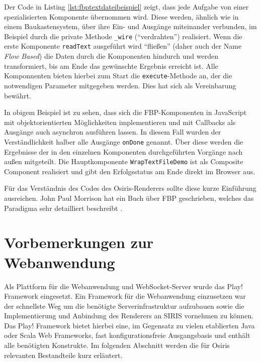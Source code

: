 Der Code in Listing \ref{lst:fbptextdateibeispiel} zeigt, dass jede Aufgabe von einer spezialisierten Komponente übernommen wird. Diese werden, ähnlich wie in einem Baukastensystem, über ihre Ein- und Ausgänge miteinander verbunden, im Beispiel durch die private Methode \texttt{\_wire} ("`verdrahten"') realisiert. Wenn die erste Komponente \texttt{readText} ausgeführt wird "`fließen"' (daher auch der Name \textit{Flow Based}) die Daten durch die Komponenten hindurch und werden transformiert, bis am Ende das gewünschte Ergebnis erreicht ist. Alle Komponnenten bieten hierbei zum Start die \texttt{execute}-Methode an, der die notwendigen Parameter mitgegeben werden. Dies hat sich als Vereinbarung bewährt.

In obigem Beispiel ist zu sehen, dass sich die FBP-Komponenten in JavaScript mit objektorientierten Möglichkeiten implementieren und mit Callbacks als Ausgänge auch asynchron ausführen lassen. In diesem Fall wurden der Verständlichkeit halber alle Ausgänge \texttt{onDone} genannt. Über diese werden die Ergebnisse der in den einzelnen Komponenten durchgeführten Vorgänge nach außen mitgeteilt. Die Hauptkomponente \texttt{WrapTextFileDemo} ist als Composite Component realisiert und gibt den Erfolgsstatus am Ende direkt im Browser aus.

Für das Verständnis des Codes des Osiris-Renderers sollte diese kurze Einführung ausreichen. John Paul Morrison hat ein Buch über FBP geschrieben, welches das Paradigma sehr detailliert beschreibt \autocite{FlowBasedProgramming}.

\section{Vorbemerkungen zur Webanwendung}
Als Plattform für die Webanwendung und WebSocket-Server wurde das Play! Framework eingesetzt. Ein Framework für die Webanwendung einzusetzen war der schnellste Weg um die benötigte Serverinfrastruktur aufzubauen sowie die Implementierung und Anbindung des Renderers an SIRIS vornehmen zu können. Das Play! Framework bietet hierbei eine, im Gegensatz zu vielen etablierten Java oder Scala Web Frameworks, fast konfigurationsfreie Ausgangsbasis und enthält alle benötigten Konstrukte. Im folgenden Abschnitt werden die für Osiris relevanten Bestandteile kurz erläutert.

